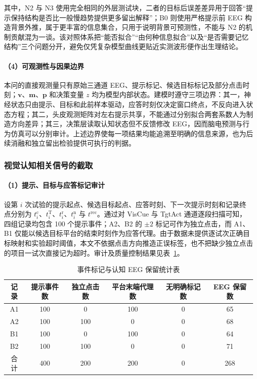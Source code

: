 \documentclass[a4paper,zihao=-4,linespread=1]{ctexart}
\numberwithin{figure}{section}       %
\begin{document}
其中，N2 与 N3 使用完全相同的外层测试块，二者的目标后误差差异用于回答“提示保持结构是否比一般慢趋势提供更多留出解释”；B0 则使用严格提示前 EEG 构造背景外推，属于更丰富的信息集合，只用于说明背景可预测性，不能与 N2 的机制贡献混为一谈。该对照体系把“能否拟合”“由何种信息拟合”以及“是否需要记忆结构”三个问题分开，避免仅凭复杂模型曲线更贴近实测波形便作出生理结论。

\paragraph{（4）可观测性与因果边界}

本问的直接观测量只有原始三通道 EEG、提示标记、候选目标标记及部分点击时刻；$\boldsymbol v$、$\boldsymbol m$、$\boldsymbol p$ 和决策变量 $z$ 均为模型内部状态。建模时遵守三项边界：其一，神经状态只由提示、目标和此前样本驱动，应答时刻仅决定窗口终点，不反向进入状态方程；其二，头皮观测矩阵对左右提示共享，不能通过分别拟合两套系数人为制造方向差异；其三，决策层读取认知状态但不反馈修改 EEG，因而脑电预测与行为仿真可以分别审计。上述边界使每一项结果均能追溯至明确的信息来源，也为后续消融和独立留出检验提供可执行的判据。

\subsubsection{视觉认知相关信号的截取}

\paragraph{（1）提示、目标与应答标记审计}

设第 $i$ 次试验的提示起点、候选目标起点、应答时刻、下一次提示时刻和记录终点分别为 $t_i^{\mathrm c}$、$t_i^{\mathrm T}$、$t_i^{\mathrm r}$、$t_i^{\mathrm n}$ 与 $t^{\mathrm{rec}}$。通过对 VisCue 与 TgtAct 通道逐段扫描可知，四组记录均包含 100 个提示事件；A2、B2 的 $\pm2$ 标记可作为独立点击，而 A1、B1 仅能以候选目标平台的结束时刻作为应答代理。由于数据未提供逐试次正确目标映射和实验超时阈值，本文不依据点击方向推造正误标签，也不把缺少独立点击的项目一试次直接记为超时。审计及质量控制结果见表~\ref{tab:q3_event_audit}。

\begin{table}[H]
\centering
\caption{事件标记与认知 EEG 保留统计表}
\label{tab:q3_event_audit}
\begin{tabular}{cccccc}
\toprule
\textbf{记录} & \textbf{提示事件数} & \textbf{独立点击数} & \textbf{平台末端代理数} & \textbf{无明确标记数} & \textbf{EEG 保留数} \\
\midrule
A1 & 100 & 0   & 100 & 0 & 65 \\
A2 & 100 & 100 & 0   & 0 & 68 \\
B1 & 100 & 0   & 100 & 0 & 64 \\
B2 & 100 & 100 & 0   & 0 & 71 \\
\midrule
合计 & 400 & 200 & 200 & 0 & 268 \\
\bottomrule
\end{tabular}
\end{table}
\end{document}

